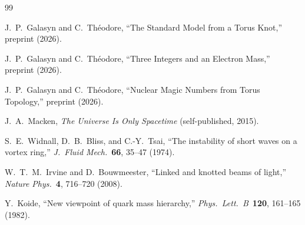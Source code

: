 \documentclass[11pt,a4paper]{article}
\begin{document}
\begin{thebibliography}{99}

J.~P.~Galasyn and C.~Th\'eodore,
``The Standard Model from a Torus Knot,''
preprint (2026).

J.~P.~Galasyn and C.~Th\'eodore,
``Three Integers and an Electron Mass,''
preprint (2026).

J.~P.~Galasyn and C.~Th\'eodore,
``Nuclear Magic Numbers from Torus Topology,''
preprint (2026).

J.~A.~Macken,
\emph{The Universe Is Only Spacetime} (self-published, 2015).

S.~E.~Widnall, D.~B.~Bliss, and C.-Y.~Tsai,
``The instability of short waves on a vortex ring,''
\emph{J.\ Fluid Mech.}\ \textbf{66}, 35--47 (1974).

W.~T.~M.~Irvine and D.~Bouwmeester,
``Linked and knotted beams of light,''
\emph{Nature Phys.}\ \textbf{4}, 716--720 (2008).

Y.~Koide,
``New viewpoint of quark mass hierarchy,''
\emph{Phys.\ Lett.\ B}\ \textbf{120}, 161--165 (1982).

\end{thebibliography}
\end{document}
